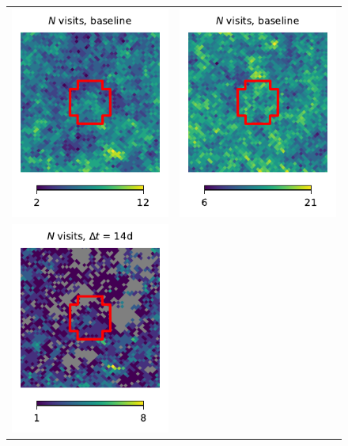 \documentclass[preprintm,linenumbers]{aastex631}
\begin{document}
\begin{figure}
\begin{tabular}{@{}c@{}c@{}}
				\includegraphics{results/skymaps_cutout/skymaps_cutout_first_year_one_snap_v4_0_10yrs_db_noDD_noTwi_nside-256_CountMetric_r_NES_noDD_noTwi.pdf} &
				\includegraphics{results/skymaps_cutout/skymaps_cutout_first_year_one_snap_v4_0_10yrs_db_noDD_noTwi_nside-256_CountMetric_r_WFD_noDD_noTwi.pdf} \\
				\includegraphics{results/skymaps_cutout/skymaps_cutout_first_year_one_snap_v4_0_10yrs_db_noDD_noTwi_tscale-14_nside-256_doAllTemplateMetrics_reduceCount_r_NES_noDD_noTwi.pdf} &

\end{tabular}
\end{figure}
\end{document}
